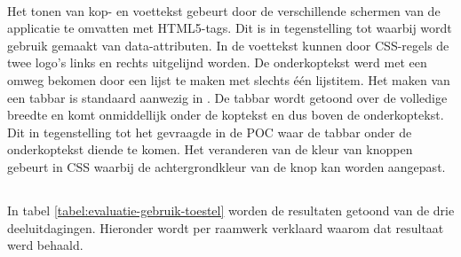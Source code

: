 \paragraph{\lungo}
Het tonen van kop- en voettekst gebeurt door de verschillende schermen van de applicatie te omvatten met HTML5-tags.
Dit is in tegenstelling tot \jqm{} waarbij wordt gebruik gemaakt van data-attributen.
In de voettekst kunnen door CSS-regels de twee logo's links en rechts uitgelijnd worden.
De onderkoptekst werd met een omweg bekomen door een lijst te maken met slechts één lijstitem.
Het maken van een tabbar is standaard aanwezig in \lungo{}.
De tabbar wordt getoond over de volledige breedte en komt onmiddellijk onder de koptekst en dus boven de onderkoptekst.
Dit in tegenstelling tot het gevraagde in de POC waar de tabbar onder de onderkoptekst diende te komen.
Het veranderen van de kleur van knoppen gebeurt in CSS waarbij de achtergrondkleur van de knop kan worden aangepast.


\subsection{}
\label{sec:evaluatie-gebruik-toestel}

In tabel \ref{tabel:evaluatie-gebruik-toestel} worden de resultaten getoond van de drie deeluitdagingen.
Hieronder wordt per raamwerk verklaard waarom dat resultaat werd behaald.

\begin{table}
\centering
{}
\caption{Gebruik van .}
\label{tabel:evaluatie-gebruik-toestel}
\end{table}

